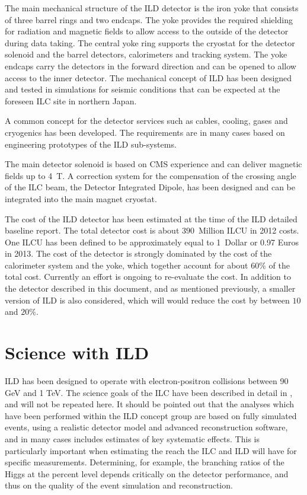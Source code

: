 \documentclass[%
 amsmath,amssymb,
 aps,
 longbibliography,
]{revtex4-1}
\begin{document}
The main mechanical structure of the ILD detector is the iron yoke that consists of three barrel rings and two endcaps. The yoke provides the required shielding for radiation and magnetic fields to allow access to the outside of the detector during data taking. The central yoke ring supports the cryostat for the detector solenoid and the barrel detectors, calorimeters and tracking system. The yoke endcaps carry the detectors in the forward direction and can be opened to allow access to the inner detector. The mechanical concept of ILD has been designed and tested in simulations for seismic conditions that can be expected at the foreseen ILC site in northern Japan.

A common concept for the detector services such as cables, cooling, gases and cryogenics has been developed. The requirements are in many cases based on engineering prototypes of the ILD sub-systems. 

The main detector solenoid is based on CMS experience and can deliver magnetic fields up to 4~T. A correction system for the compensation of the crossing angle of the ILC beam, the Detector Integrated Dipole, has been designed and can be integrated into the main magnet cryostat.

The cost of the ILD detector has been estimated at the time of the ILD detailed baseline report. The total detector cost is about $390$~Million ILCU in 2012 costs. One ILCU has been defined to be approximately equal to 1\, Dollar or 0.97 Euros in 2013. The cost of the detector is strongly dominated by the cost of the calorimeter system and the yoke, which together account for about $60\%$ of the total cost. Currently an effort is ongoing to re-evaluate the cost. In addition to the detector described in this document, and as mentioned previously, a smaller version of ILD is also considered, which will would reduce the cost by between $10$ and $20\%$. 

\section{Science with ILD}
ILD has been designed to operate with electron-positron collisions between 90 GeV and 1 TeV. The science goals of the ILC have been described in detail in \cite{ILCESU1}, and will not be repeated here. It should be pointed out that the analyses which have been performed within the ILD concept group are based on fully simulated events, using a realistic detector model and advanced reconstruction software, and in many cases includes estimates of key systematic effects. This is particularly important when estimating the reach the ILC and ILD will have for specific measurements. Determining, for example, the branching ratios of the Higgs at the percent level depends critically on the detector performance, and thus on the quality of the event simulation and reconstruction. 
\end{document}
